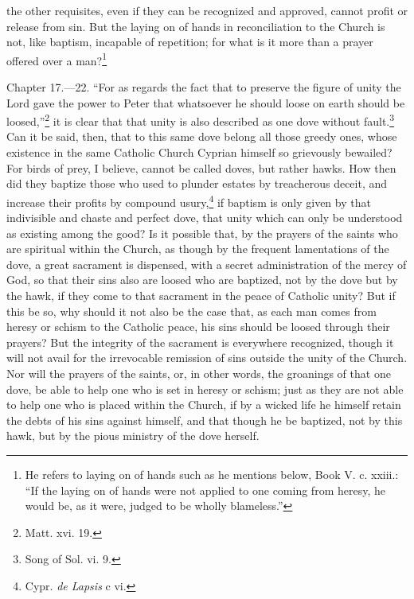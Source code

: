 the other requisites, even if they can be recognized and approved, cannot profit or release from sin. But the laying on of hands in reconciliation to the Church is not, like baptism, incapable of repetition; for what is it more than a prayer offered over a man?\footnote{\par  He refers to laying on of hands such as he mentions below, Book V. c. xxiii.: ``If the laying on of hands were not applied to one coming from heresy, he would be, as it were, judged to be wholly blameless.''}


Chapter 17.—22. ``For as regards the fact that to preserve the figure of unity the Lord gave the power to Peter that whatsoever he should loose on earth should be loosed,''\footnote{\par  Matt. xvi. 19.} it is clear that that unity is also described as one dove without fault.\footnote{\par  Song of Sol. vi. 9.} Can it be said, then, that to this same dove belong all those greedy ones, whose existence in the same Catholic Church Cyprian himself so grievously bewailed? For birds of prey, I believe, cannot be called doves, but rather hawks. How then did they baptize those who used to plunder estates by treacherous deceit, and increase their profits by compound usury,\footnote{\par  Cypr. \emph{de Lapsis} c vi.} if baptism is only given by that indivisible and chaste and perfect dove, that unity which can only be understood as existing among the good? Is it possible that, by the prayers of the saints who are spiritual within the Church, as though by the frequent lamentations of the dove, a great sacrament is dispensed, with a secret administration of the mercy of God, so that their sins also are loosed who are baptized, not by the dove but by the hawk, if they come to that sacrament in the peace of Catholic unity? But if this be so, why should it not also be the case that, as each man comes from heresy or schism to the Catholic peace, his sins should be loosed through their prayers? But the integrity of the sacrament is everywhere recognized, though it will not avail for the irrevocable remission of sins outside the unity of the Church. Nor will the prayers of the saints, or, in other words, the groanings of that one dove, be able to help one who is set in heresy or schism; just as they are not able to help one who is placed within the Church, if by a wicked life he himself retain the debts of his sins against himself, and that though he be baptized, not by this hawk, but by the pious ministry of the dove herself.

